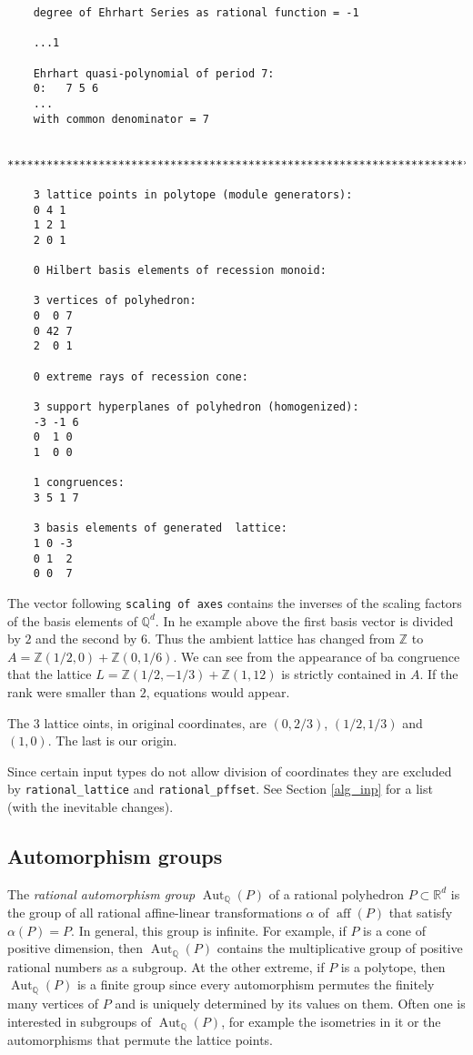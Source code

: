\documentclass[12pt,a4paper]{scrartcl}
\theoremstyle{definition}
\def\ZZ{{\mathbb Z}}
\def\QQ{{\mathbb Q}}
\def\RR{{\mathbb R}}
\DeclareMathOperator{\aff}{aff}
\begin{document}
{\begin{Verbatim}
	degree of Ehrhart Series as rational function = -1
	
	...1  
	
	Ehrhart quasi-polynomial of period 7:
	0:   7 5 6
	...
	with common denominator = 7
	
	***********************************************************************
	
	3 lattice points in polytope (module generators):
	0 4 1
	1 2 1
	2 0 1
	
	0 Hilbert basis elements of recession monoid:
	
	3 vertices of polyhedron:
	0  0 7
	0 42 7
	2  0 1
	
	0 extreme rays of recession cone:
	
	3 support hyperplanes of polyhedron (homogenized):
	-3 -1 6
	0  1 0
	1  0 0
	
	1 congruences:
	3 5 1 7
	
	3 basis elements of generated  lattice:
	1 0 -3
	0 1  2
	0 0  7
	\end{Verbatim}
	
	The vector following \verb|scaling of axes| contains the inverses of the scaling factors of the basis elements of $\QQ^d$. In he example above the first basis vector is divided by $2$ and the second by $6$. Thus the ambient lattice has changed from $\ZZ$ to $A=\ZZ(1/2,0)+\ZZ(0,1/6)$. We can see from the appearance of ba congruence that the lattice $L=\ZZ(1/2,-1/3) +\ZZ(1,12)$ is strictly contained in $A$. If the rank were smaller than $2$, equations would appear.
	
	The $3$ lattice oints, in original coordinates, are $(0,2/3)$, $(1/2,1/3) $ and $(1,0)$. The last is our origin.
	
	Since certain input types do not allow division of coordinates they are excluded by \verb|rational_lattice| and \verb|rational_pffset|. See Section \ref{alg_inp} for a list (with the inevitable changes).
	
	\subsection{Automorphism groups}\label{Automorphisms}
	
	\def\Aut{\operatorname{Aut}}
	
	The \emph{rational automorphism group} $\Aut_\QQ(P)$ of a rational polyhedron $P\subset \RR^d$ is the group of all rational affine-linear transformations $\alpha$ of $\aff(P)$  that satisfy $\alpha(P)=P$. In general, this group is infinite. For example, if $P$ is a cone of positive dimension, then $\Aut_\QQ(P)$ contains the multiplicative group of positive rational numbers as a subgroup. At the other extreme, if $P$ is a polytope, then $\Aut_\QQ(P)$ is a finite group since every automorphism permutes the finitely many vertices of $P$ and is uniquely determined by its values on them. Often one is interested in subgroups of $\Aut_\QQ(P)$, for example the isometries in it or the automorphisms that permute the lattice points. 
	
}
\end{document}
